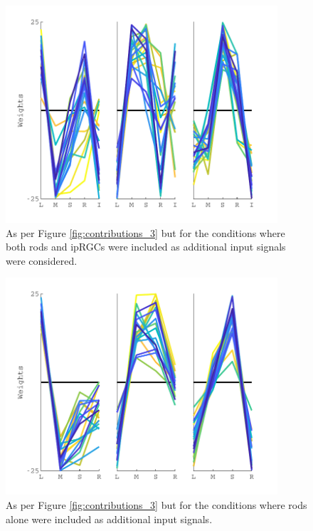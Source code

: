 \begin{figure}[htbp]
\includegraphics[max width=0.9\textwidth]{figs/LargeSphere/contributions_5.pdf}
\caption{As per Figure \ref{fig:contributions_3} but for the conditions where both rods and ipRGCs were included as additional input signals were considered.} 
\label{fig:contributions_5}
\end{figure}

\begin{figure}[htbp]
\includegraphics[max width=0.9\textwidth]{figs/LargeSphere/contributions_4.pdf}
\caption{As per Figure \ref{fig:contributions_3} but for the conditions where rods alone were included as additional input signals.} 
\label{fig:contributions_4}
\end{figure}

